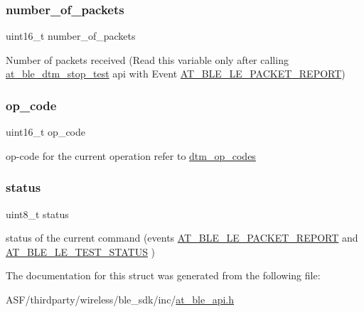 \subsubsection{\texorpdfstring{number\_of\_packets}{number\_of\_packets}}
{\footnotesize\ttfamily uint16\+\_\+t number\+\_\+of\+\_\+packets}

Number of packets received (Read this variable only after calling \mbox{\hyperlink{group__dtm__group_gafa12d16c45ae0e5efc01beba4772ab69}{at\+\_\+ble\+\_\+dtm\+\_\+stop\+\_\+test}} api with Event \mbox{\hyperlink{at__ble__api_8h_a3324640b95f33169515f89738ed5baebad529dc56000832da6054a10c8689d099}{A\+T\+\_\+\+B\+L\+E\+\_\+\+L\+E\+\_\+\+P\+A\+C\+K\+E\+T\+\_\+\+R\+E\+P\+O\+RT}}) \mbox{\label{structat__ble__dtm__t_a9ae90dd1d8198ce61dd0cac01efe7611}} 
\subsubsection{\texorpdfstring{op\_code}{op\_code}}
{\footnotesize\ttfamily uint16\+\_\+t op\+\_\+code}

op-\/code for the current operation refer to \mbox{\hyperlink{at__ble__api_8h_ac5a600d38c2e7885bc447e7cca933e3a}{dtm\+\_\+op\+\_\+codes}} \mbox{\label{structat__ble__dtm__t_ade818037fd6c985038ff29656089758d}} 
\subsubsection{\texorpdfstring{status}{status}}
{\footnotesize\ttfamily uint8\+\_\+t status}

status of the current command (events \mbox{\hyperlink{at__ble__api_8h_a3324640b95f33169515f89738ed5baebad529dc56000832da6054a10c8689d099}{A\+T\+\_\+\+B\+L\+E\+\_\+\+L\+E\+\_\+\+P\+A\+C\+K\+E\+T\+\_\+\+R\+E\+P\+O\+RT}} and \mbox{\hyperlink{at__ble__api_8h_a3324640b95f33169515f89738ed5baeba1dfeb2b9d9a9ceae264ac9eceae01f56}{A\+T\+\_\+\+B\+L\+E\+\_\+\+L\+E\+\_\+\+T\+E\+S\+T\+\_\+\+S\+T\+A\+T\+US}} ) 

The documentation for this struct was generated from the following file\+:\begin{DoxyCompactItemize}
\item 
A\+S\+F/thirdparty/wireless/ble\+\_\+sdk/inc/\mbox{\hyperlink{at__ble__api_8h}{at\+\_\+ble\+\_\+api.\+h}}\end{DoxyCompactItemize}

